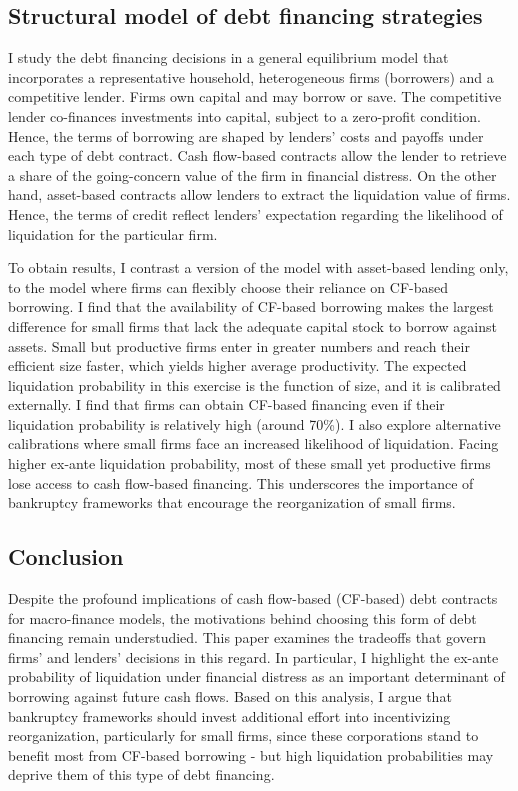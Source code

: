 \documentclass[12pt]{article}
\begin{document}
\subsection*{Structural model of debt financing strategies}
I study the debt financing decisions in a general equilibrium model that incorporates a representative household, heterogeneous firms (borrowers) and a competitive lender. Firms own capital and may borrow or save. The competitive lender co-finances investments into capital, subject to a zero-profit condition. Hence, the terms of borrowing are shaped by lenders' costs and payoffs under each type of debt contract. Cash flow-based contracts allow the lender to retrieve a share of the going-concern value of the firm in financial distress. On the other hand, asset-based contracts allow lenders to extract the liquidation value of firms. Hence, the terms of credit reflect lenders' expectation regarding the likelihood of liquidation for the particular firm.

To obtain results, I contrast a version of the model with asset-based lending only, to the model where firms can flexibly choose their reliance on CF-based borrowing. I find that the availability of CF-based borrowing makes the largest difference for small firms that lack the adequate capital stock to borrow against assets. Small but productive firms enter in greater numbers and reach their efficient size faster, which yields higher average productivity. The expected liquidation probability in this exercise is the function of size, and it is calibrated externally. I find that firms can obtain CF-based financing even if their liquidation probability is relatively high (around 70\%). I also explore alternative calibrations where small firms face an increased likelihood of liquidation. Facing higher ex-ante liquidation probability, most of these small yet productive firms lose access to cash flow-based financing. This underscores the importance of bankruptcy frameworks that encourage the reorganization of small firms.


\subsection*{Conclusion}

Despite the profound implications of cash flow-based (CF-based) debt contracts for macro-finance models, the motivations behind choosing this form of debt financing remain understudied. This paper examines the tradeoffs that govern firms' and lenders' decisions in this regard. In particular, I highlight the ex-ante probability of liquidation under financial distress as an important determinant of borrowing against future cash flows. Based on this analysis, I argue that bankruptcy frameworks should invest additional effort into incentivizing reorganization, particularly for small firms, since these corporations stand to benefit most from CF-based borrowing - but high liquidation probabilities may deprive them of this type of debt financing.
\end{document}
